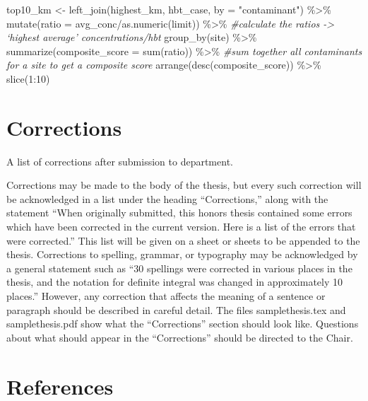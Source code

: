 \documentclass[12pt, twoside]{amherstthesis}
\newenvironment{Shaded}{\begin{snugshade}}{\end{snugshade}}
\newcommand{\AttributeTok}[1]{\textcolor[rgb]{0.77,0.63,0.00}{#1}}
\newcommand{\CommentTok}[1]{\textcolor[rgb]{0.56,0.35,0.01}{\textit{#1}}}
\newcommand{\DecValTok}[1]{\textcolor[rgb]{0.00,0.00,0.81}{#1}}
\newcommand{\FunctionTok}[1]{\textcolor[rgb]{0.00,0.00,0.00}{#1}}
\newcommand{\NormalTok}[1]{#1}
\newcommand{\OtherTok}[1]{\textcolor[rgb]{0.56,0.35,0.01}{#1}}
\newcommand{\SpecialCharTok}[1]{\textcolor[rgb]{0.00,0.00,0.00}{#1}}
\newcommand{\StringTok}[1]{\textcolor[rgb]{0.31,0.60,0.02}{#1}}
\begin{document}
\begin{Shaded}
\begin{Highlighting}[]
\NormalTok{top10\_km }\OtherTok{\textless{}{-}} \FunctionTok{left\_join}\NormalTok{(highest\_km, hbt\_case, }\AttributeTok{by =} \StringTok{"contaminant"}\NormalTok{) }\SpecialCharTok{\%\textgreater{}\%}
  \FunctionTok{mutate}\NormalTok{(}\AttributeTok{ratio =}\NormalTok{ avg\_conc}\SpecialCharTok{/}\FunctionTok{as.numeric}\NormalTok{(limit)) }\SpecialCharTok{\%\textgreater{}\%} \CommentTok{\#calculate the ratios {-}\textgreater{} ‘highest average’ concentrations/hbt}
  \FunctionTok{group\_by}\NormalTok{(site) }\SpecialCharTok{\%\textgreater{}\%}
  \FunctionTok{summarize}\NormalTok{(}\AttributeTok{composite\_score =} \FunctionTok{sum}\NormalTok{(ratio)) }\SpecialCharTok{\%\textgreater{}\%} \CommentTok{\#sum together all contaminants for a site to get a composite score}
  \FunctionTok{arrange}\NormalTok{(}\FunctionTok{desc}\NormalTok{(composite\_score)) }\SpecialCharTok{\%\textgreater{}\%}
  \FunctionTok{slice}\NormalTok{(}\DecValTok{1}\SpecialCharTok{:}\DecValTok{10}\NormalTok{)}
\end{Highlighting}
\end{Shaded}
\hypertarget{corrections}{%
\chapter*{Corrections}\label{corrections}}

A list of corrections after submission to department.

Corrections may be made to the body of the thesis, but every such correction will be acknowledged in a list under the heading ``Corrections,'' along with the statement ``When originally submitted, this honors thesis contained some errors which have been corrected in the current version. Here is a list of the errors that were corrected.'' This list will be given on a sheet or sheets to be appended to the thesis. Corrections to spelling, grammar, or typography may be acknowledged by a general statement such as ``30 spellings were corrected in various places in the thesis, and the notation for definite integral was changed in approximately 10 places.'' However, any correction that affects the meaning of a sentence or paragraph should be described in careful detail. The files samplethesis.tex and samplethesis.pdf show what the ``Corrections'' section should look like. Questions about what should appear in the ``Corrections'' should be directed to the Chair.

\backmatter

\hypertarget{references}{%
\chapter*{References}\label{references}}
\end{document}
